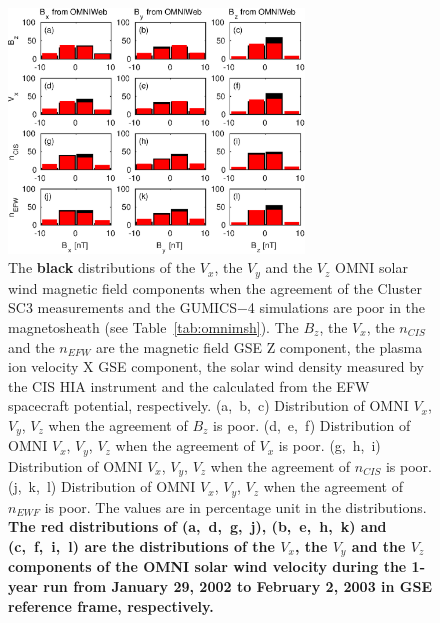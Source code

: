\documentclass[linenumbers,draft]{agujournal}
\begin{document}
\begin{figure}[h]
\centering
\includegraphics[width=0.7\textwidth,angle=0]{swe-2021-corr-f17}
\caption{The \textbf{black} distributions of the $V_{x}$, the $V_{y}$  and the $V_{z}$ OMNI solar wind magnetic field components when the agreement of the Cluster SC3 measurements and the GUMICS$-$4 simulations are poor in the magnetosheath (see Table~\ref{tab:omnimsh}). The $B_{z}$, the $V_{x}$, the $n_{CIS}$ and the $n_{EFW}$ are the magnetic field GSE Z component, the plasma ion velocity X GSE component, the  solar wind density measured by the CIS HIA instrument and the calculated from the EFW spacecraft potential, respectively. (a,~b,~c) Distribution of OMNI $V_{x}$, $V_{y}$, $V_{z}$ when the agreement of $B_{z}$ is poor. (d,~e,~f) Distribution of OMNI  $V_{x}$, $V_{y}$, $V_{z}$ when the agreement of $V_{x}$ is poor. (g,~h,~i) Distribution of OMNI $V_{x}$, $V_{y}$, $V_{z}$ when the agreement of $n_{CIS}$ is poor. (j,~k,~l) Distribution of OMNI $V_{x}$, $V_{y}$, $V_{z}$ when the agreement of $n_{EWF}$ is poor. The values are in percentage unit in the distributions. \textbf{The red distributions of (a,~d,~g,~j), (b,~e,~h,~k) and (c,~f,~i,~l) are the distributions of the $V_{x}$, the $V_{y}$ and the $V_{z}$ components of the OMNI solar wind velocity during the 1-year run from January 29, 2002 to February 2, 2003 in GSE reference frame, respectively.}}
\label{fig:mshomnivxyz}
\end{figure}

\pagebreak
\end{document}
